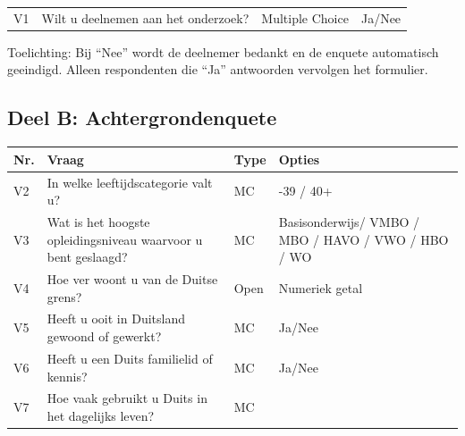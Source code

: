 \documentclass[
]{article}
\newcounter{none} %
\begin{document}
{\def\LTcaptype{none} %
\begin{longtable}[]{@{}llll@{}}
\toprule\noalign{}
\endhead
\bottomrule\noalign{}
\endlastfoot
V1 & Wilt u deelnemen aan het onderzoek? & Multiple Choice & Ja/Nee \\
\end{longtable}
}

Toelichting: Bij ``Nee'' wordt de deelnemer bedankt en de enquete
automatisch geeindigd. Alleen respondenten die ``Ja'' antwoorden
vervolgen het formulier.

\subsection{Deel B: Achtergrondenquete}\label{deel-b-achtergrondenquete}

{\def\LTcaptype{none} %
\begin{longtable}[]{@{}
  >{\raggedright\arraybackslash}p{}
  >{\raggedright\arraybackslash}p{}
  >{\raggedright\arraybackslash}p{}
  >{\raggedright\arraybackslash}p{}@{}}
\toprule\noalign{}
\begin{minipage}[b]{\linewidth}\raggedright
Nr.
\end{minipage} & \begin{minipage}[b]{\linewidth}\raggedright
Vraag
\end{minipage} & \begin{minipage}[b]{\linewidth}\raggedright
Type
\end{minipage} & \begin{minipage}[b]{\linewidth}\raggedright
Opties
\end{minipage} \\
\midrule\noalign{}
\endhead
\bottomrule\noalign{}
\endlastfoot
V2 & In welke leeftijdscategorie valt u? & MC & 18-39 / 40+ \\
V3 & Wat is het hoogste opleidingsniveau waarvoor u bent geslaagd? & MC
& Basisonderwijs/ VMBO / MBO / HAVO / VWO / HBO / WO \\
V4 & Hoe ver woont u van de Duitse grens? & Open & Numeriek getal \\
V5 & Heeft u ooit in Duitsland gewoond of gewerkt? & MC & Ja/Nee \\
V6 & Heeft u een Duits familielid of kennis? & MC & Ja/Nee \\
V7 & Hoe vaak gebruikt u Duits in het dagelijks leven? & MC &

\end{longtable}}
\end{document}

